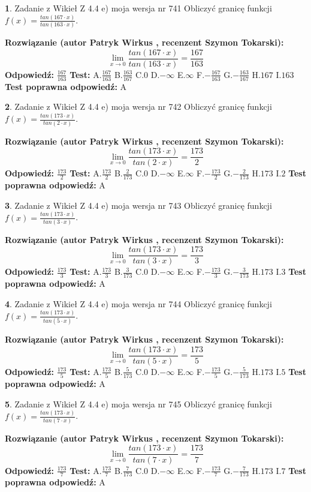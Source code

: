 \documentclass[12pt, a4paper]{article}
\theoremstyle{definition} %
\newtheorem{zad}{}
\newcommand{\zadStart}[1]{\begin{zad}#1\newline}
\newcommand{\zadStop}{\end{zad}}
\newcommand{\rozwStart}[2]{\noindent \textbf{Rozwiązanie (autor #1 , recenzent #2): }\newline}
\newcommand{\rozwStop}{\newline}
\newcommand{\odpStart}{\noindent \textbf{Odpowiedź:}\newline}
\newcommand{\odpStop}{\newline}
\newcommand{\testStart}{\noindent \textbf{Test:}\newline}
\newcommand{\testStop}{\newline}
\newcommand{\kluczStart}{\noindent \textbf{Test poprawna odpowiedź:}\newline}
\newcommand{\kluczStop}{\newline}
\begin{document}
\zadStart{Zadanie z Wikieł Z 4.4 e) moja wersja nr 741}
Obliczyć granicę funkcji $f(x)=\frac{tan(167\cdot x)}{tan(163\cdot x)}$.
\zadStop
\rozwStart{Patryk Wirkus}{Szymon Tokarski}
$$\lim\limits_{x\to 0}\frac{tan(167\cdot x)}{tan(163\cdot x)}=
\frac{167}{163}$$
\rozwStop
\odpStart
$\frac{167}{163}$
\odpStop
\testStart
A.$\frac{167}{163}$
B.$\frac{163}{167}$
C.$0$
D.$-\infty$
E.$\infty$
F.$-\frac{167}{163}$
G.$-\frac{163}{167}$
H.$167$
I.$163$
\testStop
\kluczStart
A
\kluczStop



\zadStart{Zadanie z Wikieł Z 4.4 e) moja wersja nr 742}
Obliczyć granicę funkcji $f(x)=\frac{tan(173\cdot x)}{tan(2\cdot x)}$.
\zadStop
\rozwStart{Patryk Wirkus}{Szymon Tokarski}
$$\lim\limits_{x\to 0}\frac{tan(173\cdot x)}{tan(2\cdot x)}=
\frac{173}{2}$$
\rozwStop
\odpStart
$\frac{173}{2}$
\odpStop
\testStart
A.$\frac{173}{2}$
B.$\frac{2}{173}$
C.$0$
D.$-\infty$
E.$\infty$
F.$-\frac{173}{2}$
G.$-\frac{2}{173}$
H.$173$
I.$2$
\testStop
\kluczStart
A
\kluczStop



\zadStart{Zadanie z Wikieł Z 4.4 e) moja wersja nr 743}
Obliczyć granicę funkcji $f(x)=\frac{tan(173\cdot x)}{tan(3\cdot x)}$.
\zadStop
\rozwStart{Patryk Wirkus}{Szymon Tokarski}
$$\lim\limits_{x\to 0}\frac{tan(173\cdot x)}{tan(3\cdot x)}=
\frac{173}{3}$$
\rozwStop
\odpStart
$\frac{173}{3}$
\odpStop
\testStart
A.$\frac{173}{3}$
B.$\frac{3}{173}$
C.$0$
D.$-\infty$
E.$\infty$
F.$-\frac{173}{3}$
G.$-\frac{3}{173}$
H.$173$
I.$3$
\testStop
\kluczStart
A
\kluczStop



\zadStart{Zadanie z Wikieł Z 4.4 e) moja wersja nr 744}
Obliczyć granicę funkcji $f(x)=\frac{tan(173\cdot x)}{tan(5\cdot x)}$.
\zadStop
\rozwStart{Patryk Wirkus}{Szymon Tokarski}
$$\lim\limits_{x\to 0}\frac{tan(173\cdot x)}{tan(5\cdot x)}=
\frac{173}{5}$$
\rozwStop
\odpStart
$\frac{173}{5}$
\odpStop
\testStart
A.$\frac{173}{5}$
B.$\frac{5}{173}$
C.$0$
D.$-\infty$
E.$\infty$
F.$-\frac{173}{5}$
G.$-\frac{5}{173}$
H.$173$
I.$5$
\testStop
\kluczStart
A
\kluczStop



\zadStart{Zadanie z Wikieł Z 4.4 e) moja wersja nr 745}
Obliczyć granicę funkcji $f(x)=\frac{tan(173\cdot x)}{tan(7\cdot x)}$.
\zadStop
\rozwStart{Patryk Wirkus}{Szymon Tokarski}
$$\lim\limits_{x\to 0}\frac{tan(173\cdot x)}{tan(7\cdot x)}=
\frac{173}{7}$$
\rozwStop
\odpStart
$\frac{173}{7}$
\odpStop
\testStart
A.$\frac{173}{7}$
B.$\frac{7}{173}$
C.$0$
D.$-\infty$
E.$\infty$
F.$-\frac{173}{7}$
G.$-\frac{7}{173}$
H.$173$
I.$7$
\testStop
\kluczStart
A
\kluczStop
\end{document}
